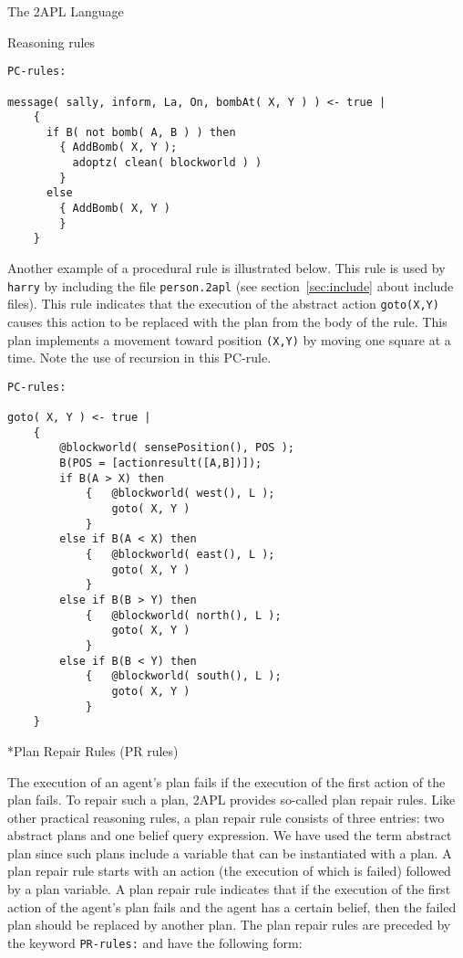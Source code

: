 \begin{chapter}{The 2APL Language}
\begin{section}{Reasoning rules}
\begin{subsection}
\begin{verbatim}
PC-rules:

message( sally, inform, La, On, bombAt( X, Y ) ) <- true |
    {
      if B( not bomb( A, B ) ) then
        { AddBomb( X, Y );
          adoptz( clean( blockworld ) )
        }
      else
        { AddBomb( X, Y )
        }
    }
\end{verbatim}

Another example of a procedural rule is illustrated below. This rule
is used by {\tt harry} by including the file {\tt person.2apl} (see
section~\ref{sec:include} about include files). This rule indicates
that the execution of the abstract action {\tt goto(X,Y)} causes
this action to be replaced with the plan from the body of the rule.
This plan implements a movement toward position {\tt (X,Y)} by
moving one square at a time. Note the use of recursion in this
PC-rule.

\begin{verbatim}
PC-rules:

goto( X, Y ) <- true |
    {
        @blockworld( sensePosition(), POS );
        B(POS = [actionresult([A,B])]);
        if B(A > X) then
            {   @blockworld( west(), L );
                goto( X, Y )
            }
        else if B(A < X) then
            {   @blockworld( east(), L );
                goto( X, Y )
            }
        else if B(B > Y) then
            {   @blockworld( north(), L );
                goto( X, Y )
            }
        else if B(B < Y) then
            {   @blockworld( south(), L );
                goto( X, Y )
            }
    }
\end{verbatim}
\end{subsection}


\begin{subsection}*{Plan Repair Rules (PR rules)}\label{sec:prrules}

The execution of an agent's plan fails if the execution of the first
action of the plan fails. To repair such a plan, 2APL provides
so-called plan repair rules. Like other practical reasoning rules, a
plan repair rule consists of three entries: two abstract plans and
one belief query expression. We have used the term abstract plan
since such plans include a variable that can be instantiated with a
plan. A plan repair rule starts with an action (the execution of
which is failed) followed by a plan variable. A plan repair rule
indicates that if the execution of the first action of the agent's
plan fails and the agent has a certain belief, then the failed plan
should be replaced by another plan. The plan repair rules are
preceded by the keyword {\tt PR-rules:} and have the following form:


\end{subsection}
\end{section}
\end{chapter}
